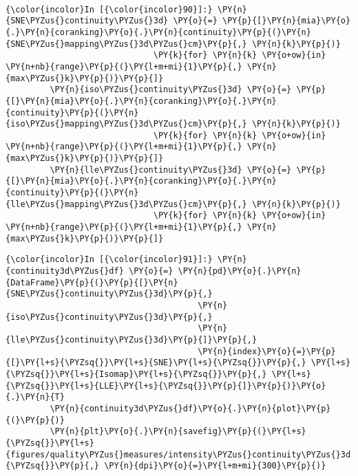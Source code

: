     \begin{center}
    \end{center}
    { \hspace*{\fill} \\}

    \begin{Verbatim}[commandchars=\\\{\}]
{\color{incolor}In [{\color{incolor}90}]:} \PY{n}{SNE\PYZus{}continuity\PYZus{}3d} \PY{o}{=} \PY{p}{[}\PY{n}{mia}\PY{o}{.}\PY{n}{coranking}\PY{o}{.}\PY{n}{continuity}\PY{p}{(}\PY{n}{SNE\PYZus{}mapping\PYZus{}3d\PYZus{}cm}\PY{p}{,} \PY{n}{k}\PY{p}{)}
                              \PY{k}{for} \PY{n}{k} \PY{o+ow}{in} \PY{n+nb}{range}\PY{p}{(}\PY{l+m+mi}{1}\PY{p}{,} \PY{n}{max\PYZus{}k}\PY{p}{)}\PY{p}{]}
         \PY{n}{iso\PYZus{}continuity\PYZus{}3d} \PY{o}{=} \PY{p}{[}\PY{n}{mia}\PY{o}{.}\PY{n}{coranking}\PY{o}{.}\PY{n}{continuity}\PY{p}{(}\PY{n}{iso\PYZus{}mapping\PYZus{}3d\PYZus{}cm}\PY{p}{,} \PY{n}{k}\PY{p}{)}
                              \PY{k}{for} \PY{n}{k} \PY{o+ow}{in} \PY{n+nb}{range}\PY{p}{(}\PY{l+m+mi}{1}\PY{p}{,} \PY{n}{max\PYZus{}k}\PY{p}{)}\PY{p}{]}
         \PY{n}{lle\PYZus{}continuity\PYZus{}3d} \PY{o}{=} \PY{p}{[}\PY{n}{mia}\PY{o}{.}\PY{n}{coranking}\PY{o}{.}\PY{n}{continuity}\PY{p}{(}\PY{n}{lle\PYZus{}mapping\PYZus{}3d\PYZus{}cm}\PY{p}{,} \PY{n}{k}\PY{p}{)}
                              \PY{k}{for} \PY{n}{k} \PY{o+ow}{in} \PY{n+nb}{range}\PY{p}{(}\PY{l+m+mi}{1}\PY{p}{,} \PY{n}{max\PYZus{}k}\PY{p}{)}\PY{p}{]}
\end{Verbatim}

    \begin{Verbatim}[commandchars=\\\{\}]
{\color{incolor}In [{\color{incolor}91}]:} \PY{n}{continuity3d\PYZus{}df} \PY{o}{=} \PY{n}{pd}\PY{o}{.}\PY{n}{DataFrame}\PY{p}{(}\PY{p}{[}\PY{n}{SNE\PYZus{}continuity\PYZus{}3d}\PY{p}{,}
                                       \PY{n}{iso\PYZus{}continuity\PYZus{}3d}\PY{p}{,}
                                       \PY{n}{lle\PYZus{}continuity\PYZus{}3d}\PY{p}{]}\PY{p}{,}
                                       \PY{n}{index}\PY{o}{=}\PY{p}{[}\PY{l+s}{\PYZsq{}}\PY{l+s}{SNE}\PY{l+s}{\PYZsq{}}\PY{p}{,} \PY{l+s}{\PYZsq{}}\PY{l+s}{Isomap}\PY{l+s}{\PYZsq{}}\PY{p}{,} \PY{l+s}{\PYZsq{}}\PY{l+s}{LLE}\PY{l+s}{\PYZsq{}}\PY{p}{]}\PY{p}{)}\PY{o}{.}\PY{n}{T}
         \PY{n}{continuity3d\PYZus{}df}\PY{o}{.}\PY{n}{plot}\PY{p}{(}\PY{p}{)}
         \PY{n}{plt}\PY{o}{.}\PY{n}{savefig}\PY{p}{(}\PY{l+s}{\PYZsq{}}\PY{l+s}{figures/quality\PYZus{}measures/intensity\PYZus{}continuity\PYZus{}3d.png}\PY{l+s}{\PYZsq{}}\PY{p}{,} \PY{n}{dpi}\PY{o}{=}\PY{l+m+mi}{300}\PY{p}{)}
\end{Verbatim}

